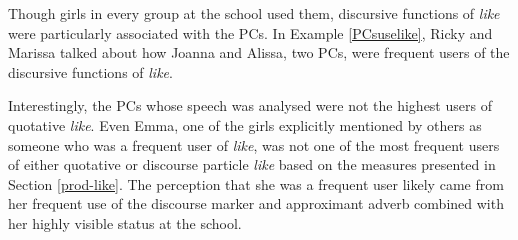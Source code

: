 \label{momdoesnotlikelike}
\vspace{5 mm}


\noindent Though girls in every group at the school used them, discursive functions of \textit{like} were particularly associated with the PCs.  In Example \ref{PCsuselike}, Ricky and Marissa talked about how Joanna and Alissa, two PCs, were frequent users of the discursive functions of \textit{like}.

\label{PCsuselike}
\vspace{5 mm}


\noindent Interestingly, the PCs whose speech was analysed were not the highest users of quotative \textit{like}.  Even Emma, one of the girls explicitly mentioned by others as someone who was a frequent user of \textit{like}, was not one of the most frequent users of either quotative or discourse particle \textit{like} based on the measures presented in Section \ref{prod-like}.  The perception that she was a frequent user likely came from her frequent use of the discourse marker and approximant adverb combined with her highly visible status at the school.  

